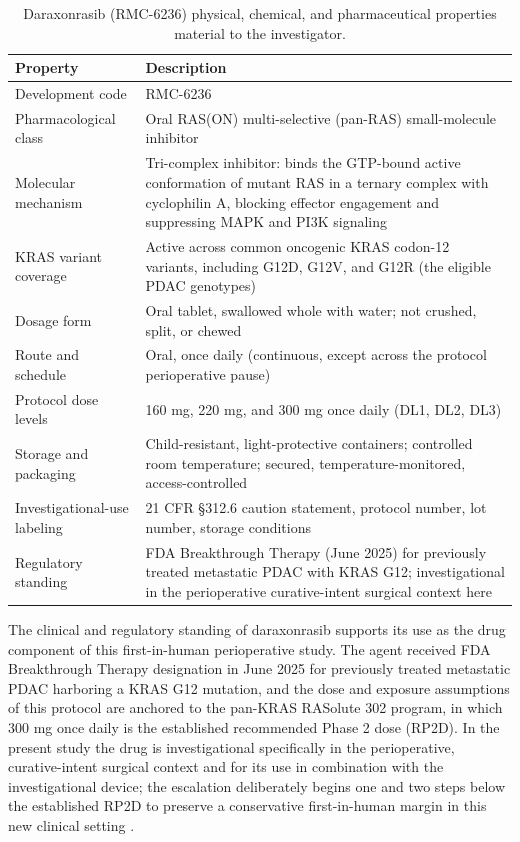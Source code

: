 \begin{table}[t]
\caption{Daraxonrasib (RMC-6236) physical, chemical, and pharmaceutical properties material to the investigator.}
\label{tab:sec04-drugprops}
\centering
\begin{tabularx}{\textwidth}{L{4.0cm} Y}
\toprule
\textbf{Property} & \textbf{Description} \\
\midrule
Development code & RMC-6236 \\
Pharmacological class & Oral RAS(ON) multi-selective (pan-RAS) small-molecule inhibitor \\
Molecular mechanism & Tri-complex inhibitor: binds the GTP-bound active conformation of mutant RAS in a ternary complex with cyclophilin A, blocking effector engagement and suppressing MAPK and PI3K signaling \\
KRAS variant coverage & Active across common oncogenic KRAS codon-12 variants, including G12D, G12V, and G12R (the eligible PDAC genotypes) \\
Dosage form & Oral tablet, swallowed whole with water; not crushed, split, or chewed \\
Route and schedule & Oral, once daily (continuous, except across the protocol perioperative pause) \\
Protocol dose levels & 160 mg, 220 mg, and 300 mg once daily (DL1, DL2, DL3) \\
Storage and packaging & Child-resistant, light-protective containers; controlled room temperature; secured, temperature-monitored, access-controlled \\
Investigational-use labeling & 21 CFR \S 312.6 caution statement, protocol number, lot number, storage conditions \\
Regulatory standing & FDA Breakthrough Therapy (June 2025) for previously treated metastatic PDAC with KRAS G12; investigational in the perioperative curative-intent surgical context here \\
\bottomrule
\end{tabularx}
\end{table}

The clinical and regulatory standing of daraxonrasib supports its use as the drug
component of this first-in-human perioperative study. The agent received FDA
Breakthrough Therapy designation in June 2025 for previously treated metastatic
PDAC harboring a KRAS G12 mutation, and the dose and exposure assumptions of this
protocol are anchored to the pan-KRAS RASolute 302 program, in which 300 mg once
daily is the established recommended Phase 2 dose (RP2D). In the present study the
drug is investigational specifically in the perioperative, curative-intent
surgical context and for its use in combination with the investigational device;
the escalation deliberately begins one and two steps below the established RP2D to
preserve a conservative first-in-human margin in this new clinical setting
\cite{daraxwhipple,natlpaiplatf}.

